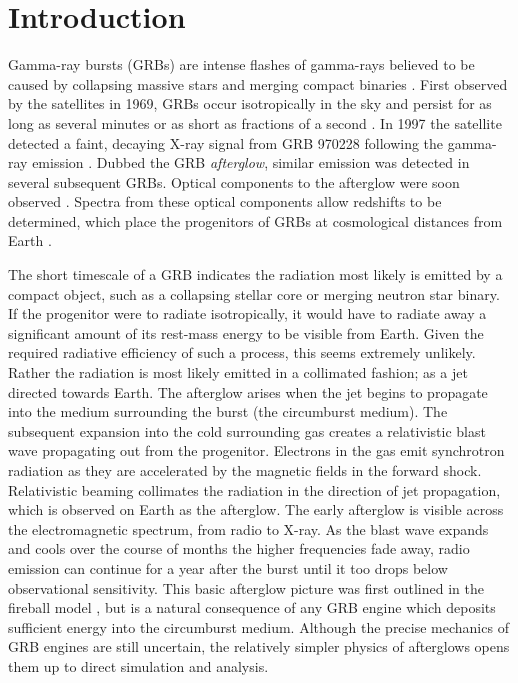 \section{Introduction}


Gamma-ray bursts (GRBs) are intense flashes of gamma-rays believed to be caused by collapsing massive stars and merging compact binaries \citep{Woosley93, MacFadyen99, Eichler89}.  First observed by the \vela{} satellites in 1969, GRBs occur isotropically in the sky and persist for as long as several minutes or as short as fractions of a second \citep{Klebesadel73}.  In 1997 the \bepposax{} satellite detected a faint, decaying X-ray signal from GRB 970228 following the gamma-ray emission \citep{Costa97}.  Dubbed the GRB \emph{afterglow}, similar emission was detected in several subsequent GRBs.  Optical components to the afterglow were soon observed \citep{Groot97}.  Spectra from these optical components allow redshifts to be determined, which place the progenitors of GRBs at cosmological distances from Earth \citep{Metzger97}.  

The short timescale of a GRB indicates the radiation most likely is emitted by a compact object, such as a collapsing stellar core or merging neutron star binary.  If the progenitor were to radiate isotropically, it would have to radiate away a significant amount of its rest-mass energy to be visible from Earth.  Given the required radiative efficiency of such a process, this seems extremely unlikely.  Rather the radiation is most likely emitted in a collimated fashion; as a jet directed towards Earth.  The afterglow arises when the jet begins to propagate into the medium surrounding the burst (the circumburst medium).  The subsequent expansion into the cold surrounding gas creates a relativistic blast wave propagating out from the progenitor.  Electrons in the gas emit synchrotron radiation as they are accelerated by the magnetic fields in the forward shock.  Relativistic beaming collimates the radiation in the direction of jet propagation, which is observed on Earth as the afterglow.  The early afterglow is visible across the electromagnetic spectrum, from radio to X-ray.  As the blast wave expands and cools over the course of months the higher frequencies fade away, radio emission can continue for a year after the burst until it too drops below observational sensitivity.  This basic afterglow picture was first outlined in the fireball model \citep{Rees92}, but is a natural consequence of any GRB engine which deposits sufficient energy into the circumburst medium.  Although the precise mechanics of GRB engines are still uncertain, the relatively simpler physics of afterglows opens them up to direct simulation and analysis.


